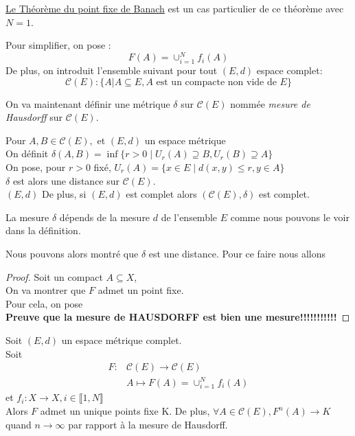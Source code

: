 \documentclass[a4paper, 12pt]{report}
\begin{document}
			\begin{remark*}
			\hyperref[ThmPtFixe]{Le Théorème du point fixe de Banach} est un cas particulier de ce théorème avec $N=1$.
			\end{remark*}
		
			Pour simplifier, on pose :
			\begin{equation*}
				F(A)=\cup^N_{i=1}f_i(A)
			\end{equation*}
			De plus, on introduit l'ensemble suivant pour tout $(E,d)$ espace complet:
			\begin{equation*}
				\mathcal{C}(E) : \{A|A\subseteq E, A\textrm{ est un compacte non vide de }E\}
			\end{equation*}
			
			\hspace{.7 cm}On va maintenant définir une métrique $\delta$ sur $\mathcal{C}(E)$ nommée \textit{mesure de Hausdorff} sur $\mathcal{C}(E)$.
			\begin{prop}
				\label{mesHauss}
				Pour $A,B\in\mathcal{C}(E),$ et $(E,d)$ un espace métrique\\
				On définit $\delta(A,B)=\inf\{r>0\mid U_r(A)\supseteq B, U_r(B)\supseteq A\}$\\
				On pose, pour $r>0$ fixé, $U_r(A)=\{x\in E\mid d(x,y)\leq r,y\in A\}$\\
				$\delta$ est alors une distance sur $\mathcal{C}(E)$.\\$(E,d)$
				De plus, si $(E,d)$ est complet alors $(\mathcal{C}(E),\delta)$ est complet.
			\end{prop}
			\begin{remark*}
				La mesure $\delta$ dépends de la mesure $d$ de l'ensemble $E$ comme nous pouvons le voir dans la définition. 
			\end{remark*}

			
			\hspace{.7 cm}Nous pouvons alors montré que $\delta$ est une distance. Pour ce faire nous allons 
			\begin{proof}
				Soit un compact $A\subseteq X$,\\
				On va montrer que $F$ admet un point fixe.\\
				Pour cela, on pose \\
				\textbf{Preuve que la mesure de HAUSDORFF est bien une mesure!!!!!!!!!!!}
			\end{proof}
			
			\begin{theorem}
			\label{ThmConverge}
				Soit $(E,d)$ un espace métrique complet.\\
				Soit 
				\begin{align*}
					F:&\mathcal{C}(E)\longrightarrow \mathcal{C}(E)\\
					&A\longmapsto F(A)=\cup^N_{i=1}f_i(A)
				\end{align*}
				et $f_i:X \longrightarrow X, i\in\llbracket 1,N\rrbracket$\\
				Alors $F$ admet un unique points fixe K. De plus, $\forall A\in\mathcal{C}(E), F^n(A)\longrightarrow K$ quand ${n\to\infty}$ par rapport à la mesure de Hausdorff.
			\end{theorem}
\end{document}
